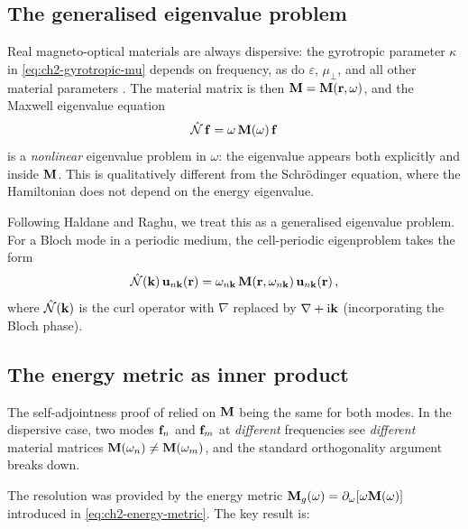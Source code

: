 \subsection{The generalised eigenvalue problem}
\label{sec:ch3-gen-evp}

Real magneto-optical materials are always dispersive: the gyrotropic
parameter $\kappa$ in \eqref{eq:ch2-gyrotropic-mu} depends on
frequency, as do $\varepsilon$, $\mu_\perp$, and all other material
parameters
\cite{wang2007reflection}.  The material matrix is then $\mathbf{M}=\mathbf{M}(\mathbf{r},\omega)$,
and the Maxwell eigenvalue equation
\begin{equation}\label{eq:ch3-gen-evp}
  \hat{\mathcal{N}}\,\mathbf{f} = \omega\,\mathbf{M}(\omega)\,\mathbf{f}
\end{equation}
is a \emph{nonlinear} eigenvalue problem in $\omega$: the eigenvalue
appears both explicitly and inside $\mathbf{M}$.  This is qualitatively
different from the Schr\"odinger equation, where the Hamiltonian does
not depend on the energy eigenvalue.

Following Haldane and Raghu, we treat this as a generalised eigenvalue
problem.  For a Bloch mode in a periodic medium, the cell-periodic
eigenproblem takes the form
\begin{equation}\label{eq:ch3-bloch-gen-evp}
  \hat{\mathcal{N}}(\mathbf{k})\,\mathbf{u}_{n\mathbf{k}}(\mathbf{r})
  = \omega_{n\mathbf{k}}\,\mathbf{M}(\mathbf{r},\omega_{n\mathbf{k}})\,
    \mathbf{u}_{n\mathbf{k}}(\mathbf{r})\,,
\end{equation}
where $\hat{\mathcal{N}}(\mathbf{k})$ is the curl operator with $\nabla$ replaced by
$\nabla+\mathrm{i}\mathbf{k}$ (incorporating the Bloch phase).

\subsection{The energy metric as inner product}
\label{sec:ch3-energy-metric-ip}

The self-adjointness proof of 
relied on $\mathbf{M}$ being the same for both modes.  In the dispersive
case, two modes $\mathbf{f}_n$ and $\mathbf{f}_m$ at \emph{different}
frequencies see \emph{different} material matrices
$\mathbf{M}(\omega_n)\neq\mathbf{M}(\omega_m)$, and the standard orthogonality
argument breaks down.

The resolution was provided by the energy metric
$\mathbf{M}_g(\omega)=\partial_\omega[\omega\mathbf{M}(\omega)]$ introduced in
\eqref{eq:ch2-energy-metric}.  The key result is:

